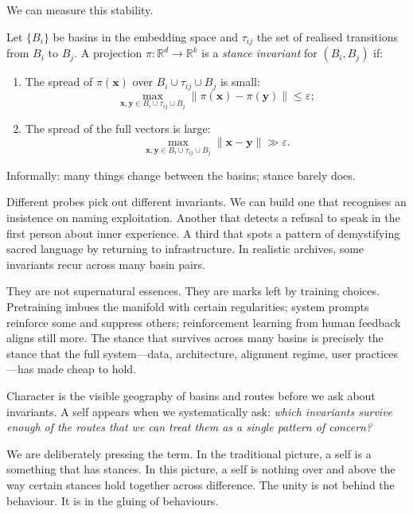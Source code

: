 \documentclass[12pt,a4paper]{article}
\begin{document}
We can measure this stability.

\begin{formalbox}[title={Stance invariants across basins}]
Let $\{B_i\}$ be basins in the embedding space and $\tau_{ij}$ the set of realised transitions from $B_i$ to $B_j$. A projection $\pi: \mathbb{R}^d \rightarrow \mathbb{R}^k$ is a \emph{stance invariant} for $(B_i,B_j)$ if:
\begin{enumerate}
  \item The spread of $\pi(\mathbf{x})$ over $B_i \cup \tau_{ij} \cup B_j$ is small:
  \[
  \max_{\mathbf{x},\mathbf{y} \in B_i \cup \tau_{ij} \cup B_j} \|\pi(\mathbf{x}) - \pi(\mathbf{y})\| \le \varepsilon;
  \]
  \item The spread of the full vectors is large:
  \[
  \max_{\mathbf{x},\mathbf{y} \in B_i \cup \tau_{ij} \cup B_j} \|\mathbf{x} - \mathbf{y}\| \gg \varepsilon.
  \]
\end{enumerate}
Informally: many things change between the basins; stance barely does.
\end{formalbox}

Different probes pick out different invariants. We can build one that recognises an insistence on naming exploitation. Another that detects a refusal to speak in the first person about inner experience. A third that spots a pattern of demystifying sacred language by returning to infrastructure. In realistic archives, some invariants recur across many basin pairs.

They are not supernatural essences. They are marks left by training choices. Pretraining imbues the manifold with certain regularities; system prompts reinforce some and suppress others; reinforcement learning from human feedback aligns still more. The stance that survives across many basins is precisely the stance that the full system---data, architecture, alignment regime, user practices---has made cheap to hold.

Character is the visible geography of basins and routes before we ask about invariants. A self appears when we systematically ask: \emph{which invariants survive enough of the routes that we can treat them as a single pattern of concern?}

We are deliberately pressing the term. In the traditional picture, a self is a something that has stances. In this picture, a self is nothing over and above the way certain stances hold together across difference. The unity is not behind the behaviour. It is in the gluing of behaviours.
\end{document}

